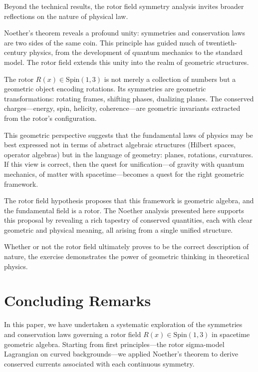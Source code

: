 \documentclass[11pt,a4paper]{article}
\numberwithin{equation}{section}
\theoremstyle{plain}
\theoremstyle{definition}
\theoremstyle{remark}
\begin{document}
Beyond the technical results, the rotor field symmetry analysis invites broader reflections on the nature of physical law.

Noether's theorem reveals a profound unity: symmetries and conservation laws are two sides of the same coin. This principle has guided much of twentieth-century physics, from the development of quantum mechanics to the standard model. The rotor field extends this unity into the realm of geometric structures.

The rotor $R(x) \in \mathrm{Spin}(1,3)$ is not merely a collection of numbers but a geometric object encoding rotations. Its symmetries are geometric transformations: rotating frames, shifting phases, dualizing planes. The conserved charges---energy, spin, helicity, coherence---are geometric invariants extracted from the rotor's configuration.

This geometric perspective suggests that the fundamental laws of physics may be best expressed not in terms of abstract algebraic structures (Hilbert spaces, operator algebras) but in the language of geometry: planes, rotations, curvatures. If this view is correct, then the quest for unification---of gravity with quantum mechanics, of matter with spacetime---becomes a quest for the right geometric framework.

The rotor field hypothesis proposes that this framework is geometric algebra, and the fundamental field is a rotor. The Noether analysis presented here supports this proposal by revealing a rich tapestry of conserved quantities, each with clear geometric and physical meaning, all arising from a single unified structure.

Whether or not the rotor field ultimately proves to be the correct description of nature, the exercise demonstrates the power of geometric thinking in theoretical physics.

\section{Concluding Remarks}
\label{sec:conclusion}

In this paper, we have undertaken a systematic exploration of the symmetries and conservation laws governing a rotor field $R(x) \in \mathrm{Spin}(1,3)$ in spacetime geometric algebra. Starting from first principles---the rotor sigma-model Lagrangian on curved backgrounds---we applied Noether's theorem to derive conserved currents associated with each continuous symmetry.
\end{document}
